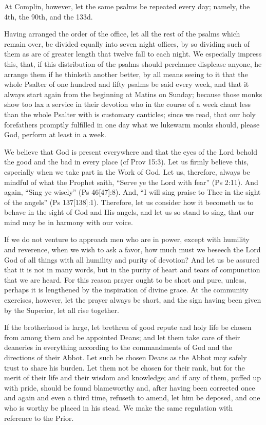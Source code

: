 At Complin, however, let the same psalms be repeated every day; namely, the 4th, the 90th, and the 133d.

Having arranged the order of the office, let all the rest of the psalms which remain over, be divided equally into seven night offices, by so dividing such of them as are of greater length that twelve fall to each night. We especially impress this, that, if this distribution of the psalms should perchance displease anyone, he arrange them if he thinketh another better, by all means seeing to it that the whole Psalter of one hundred and fifty psalms be said every week, and that it always start again from the beginning at Matins on Sunday; because those monks show too lax a service in their devotion who in the course of a week chant less than the whole Psalter with is customary canticles; since we read, that our holy forefathers promptly fulfilled in one day what we lukewarm monks should, please God, perform at least in a week.


We believe that God is present everywhere and that the eyes of the Lord behold the good and the bad in every place (cf Prov 15:3). Let us firmly believe this, especially when we take part in the Work of God. Let us, therefore, always be mindful of what the Prophet saith, ``Serve ye the Lord with fear'' (Ps 2:11). And again, ``Sing ye wisely'' (Ps 46[47]:8). And, ``I will sing praise to Thee in the sight of the angels'' (Ps 137[138]:1). Therefore, let us consider how it becometh us to behave in the sight of God and His angels, and let us so stand to sing, that our mind may be in harmony with our voice.


If we do not venture to approach men who are in power, except with humility and reverence, when we wish to ask a favor, how much must we beseech the Lord God of all things with all humility and purity of devotion? And let us be assured that it is not in many words, but in the purity of heart and tears of compunction that we are heard. For this reason prayer ought to be short and pure, unless, perhaps it is lengthened by the inspiration of divine grace. At the community exercises, however, let the prayer always be short, and the sign having been given by the Superior, let all rise together.


If the brotherhood is large, let brethren of good repute and holy life be chosen from among them and be appointed Deans; and let them take care of their deaneries in everything according to the commandments of God and the directions of their Abbot. Let such be chosen Deans as the Abbot may safely trust to share his burden. Let them not be chosen for their rank, but for the merit of their life and their wisdom and knowledge; and if any of them, puffed up with pride, should be found blameworthy and, after having been corrected once and again and even a third time, refuseth to amend, let him be deposed, and one who is worthy be placed in his stead. We make the same regulation with reference to the Prior.

